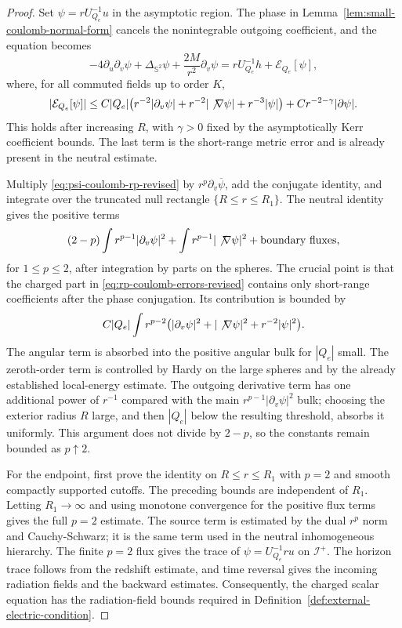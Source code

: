 \documentclass[11pt]{article}
\numberwithin{equation}{section}
\theoremstyle{plain}
\theoremstyle{definition}
\theoremstyle{remark}
\begin{document}
\begin{proof}

Set \(\psi=rU_{Q_e}^{-1}u\) in the asymptotic region.  The phase in Lemma~\ref{lem:small-coulomb-normal-form} cancels the nonintegrable outgoing coefficient, and the equation becomes
\begin{equation}\label{eq:psi-coulomb-rp-revised}
 -4\partial_u\partial_v\psi+\Delta_{\mathbb S^2}\psi
 +\frac{2M}{r^2}\partial_v\psi
 =rU_{Q_e}^{-1}h+\mathcal E_{Q_e}[\psi],
\end{equation}
where, for all commuted fields up to order \(K\),
\begin{equation}\label{eq:rp-coulomb-errors-revised}
 |\mathcal E_{Q_e}[\psi]|
 \le C|Q_e|\bigl(r^{-2}|\partial_v\psi|+r^{-2}|\not\nabla\psi|+r^{-3}|\psi|\bigr)
      +C r^{-2-\gamma}|\partial\psi|.
\end{equation}
This holds after increasing \(R\), with \(\gamma>0\) fixed by the asymptotically Kerr coefficient bounds.  The last term is the short-range metric error and is already present in the neutral estimate.

Multiply \eqref{eq:psi-coulomb-rp-revised} by \(r^p\partial_v\overline\psi\), add the conjugate identity, and integrate over the truncated null rectangle \(\{R\le r\le R_1\}\).  The neutral identity gives the positive terms
\[
 (2-p)\int r^{p-1}|\partial_v\psi|^2
 +\int r^{p-1}|\not\nabla\psi|^2
 +\text{boundary fluxes},
\]
for \(1\le p\le2\), after integration by parts on the spheres.  The crucial point is that the charged part in \eqref{eq:rp-coulomb-errors-revised} contains only short-range coefficients after the phase conjugation.  Its contribution is bounded by
\[
 C|Q_e|\int r^{p-2}\bigl(|\partial_v\psi|^2+|\not\nabla\psi|^2+r^{-2}|\psi|^2\bigr).
\]
The angular term is absorbed into the positive angular bulk for \(|Q_e|\) small.  The zeroth-order term is controlled by Hardy on the large spheres and by the already established local-energy estimate.  The outgoing derivative term has one additional power of \(r^{-1}\) compared with the main \(r^{p-1}|\partial_v\psi|^2\) bulk; choosing the exterior radius \(R\) large, and then \(|Q_e|\) below the resulting threshold, absorbs it uniformly.  This argument does not divide by \(2-p\), so the constants remain bounded as \(p\uparrow2\).

For the endpoint, first prove the identity on \(R\le r\le R_1\) with \(p=2\) and smooth compactly supported cutoffs.  The preceding bounds are independent of \(R_1\).  Letting \(R_1\to\infty\) and using monotone convergence for the positive flux terms gives the full \(p=2\) estimate.  The source term is estimated by the dual \(r^p\) norm and Cauchy-Schwarz; it is the same term used in the neutral inhomogeneous hierarchy.  The finite \(p=2\) flux gives the trace of \(\psi=U_{Q_e}^{-1}ru\) on \(\mathcal I^+\).  The horizon trace follows from the redshift estimate, and time reversal gives the incoming radiation fields and the backward estimates.  Consequently, the charged scalar equation has the radiation-field bounds required in Definition~\ref{def:external-electric-condition}.

\end{proof}
\end{document}
